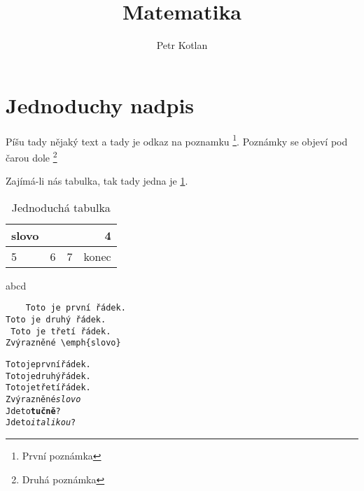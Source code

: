 \documentclass[a4paper, 12pt]{article}
\title{Matematika}
\author{Petr Kotlan}
\date{}
\begin{document}
\maketitle


\section{Jednoduchy nadpis}
Píšu tady nějaký text a tady je odkaz na poznamku \footnote[1]{První poznámka}.
Poznámky \footnotemark[1]{} se objeví pod čarou dole \footnote{Druhá poznámka}

Zajímá-li nás tabulka, tak tady jedna je \ref{jednoducha tabulka}.

\begin{table}[h]
    \centering
    \caption{Jednoduchá tabulka}
    \label{jednoducha tabulka}
    \medskip
    \begin{tabular}{| l | p{3cm} | c | r |}
        \hline
        slovo &   &   & 4 \\
        \hline
        \hline
        5 & 6 & 7 & konec  \\
        \hline
    \end{tabular}
\end{table}

\listoftables

\begin{multicols}{4}
    \tiny
    \lipsum[1-2]
\end{multicols}

{\scriptsize
\lipsum[1]}

\textgreek{abcd}

\begin{verbatim}
    Toto je první řádek.
Toto je druhý řádek.
 Toto je třetí řádek.
Zvýrazněné \emph{slovo}
\end{verbatim}

\begin{alltt}
    Toto je první řádek.
    Toto je druhý řádek.
     Toto je třetí řádek.
    Zvýrazněné \emph{slovo}
    Jde to \textbf{tučně}?
    Jde to \textit{italikou}?
\end{alltt}

\begin{quote}
    \lipsum[1-2]
\end{quote}

\begin{quotation}
    \lipsum[1-2] \cite[Str. 21-22]{Tolkien1991}
\end{quotation}
\end{document}
